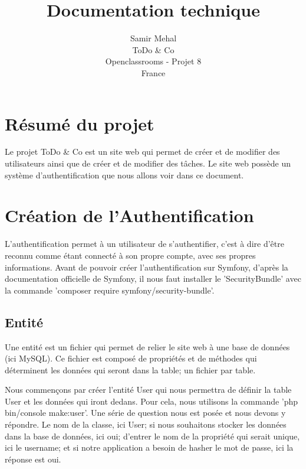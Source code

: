 \documentclass{article}
\title{Documentation technique}
\author{Samir Mehal\\
  \small ToDo \& Co\\
  \small Openclassrooms - Projet 8\\
  \small France
}
\theoremstyle{definition}
\theoremstyle{remark}
\begin{document}
\maketitle


\newpage

\tableofcontents

\newpage




\section{Résumé du projet}

Le projet ToDo \& Co est un site web qui permet de créer et de modifier des utilisateurs ainsi que de créer et de modifier des tâches. Le site web possède un système d'authentification que nous allons voir dans ce document.

\section{Création de l'Authentification}

L'authentification permet à un utilisateur de s'authentifier, c'est à dire d'être reconnu comme étant connecté à son propre compte, avec ses propres informations. Avant de pouvoir créer l'authentification sur Symfony, d'après la documentation officielle de Symfony, il nous faut installer le 'SecurityBundle' avec la commande 'composer require symfony/security-bundle'.

\subsection{Entité}

Une entité est un fichier qui permet de relier le site web à une base de données (ici MySQL). Ce fichier est composé de propriétés et de méthodes qui déterminent les données qui seront dans la table; un fichier par table.

Nous commençons par créer l'entité User qui nous permettra de définir la table User et les données qui iront dedans. Pour cela, nous utilisons la commande 'php bin/console make:user'. Une série de question nous est posée et nous devons y répondre. Le nom de la classe, ici User; si nous souhaitons stocker les données dans la base de données, ici oui; d'entrer le nom de la propriété qui serait unique, ici le username; et si notre application a besoin de hasher le mot de passe, ici la réponse est oui.
\end{document}
